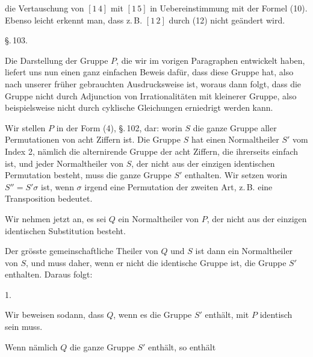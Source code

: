 
die Vertauschung von $[1\,4]$ mit $[1\,5]$ in Uebereinstimmung mit der Formel (10). Ebenso leicht erkennt man, dass z.\,B. $[1\,2]$ durch (12) nicht geändert wird.

\begin{center}
\S.\,103.

\end{center}

Die Darstellung der Gruppe $P$, die wir im vorigen Paragraphen entwickelt haben, liefert uns nun einen ganz einfachen Beweis dafür, dass diese Gruppe  hat, also nach unserer früher gebrauchten Ausdrucksweise  ist, woraus dann folgt, dass die Gruppe nicht durch Adjunction von Irrationalitäten mit kleinerer Gruppe, also beispielsweise nicht durch cyklische Gleichungen erniedrigt werden kann.

Wir stellen $P$ in der Form (4), \S.\,102, dar:
worin $S$ die ganze Gruppe aller Permutationen von acht Ziffern ist. Die Gruppe $S$ hat einen Normaltheiler $S'$ vom Index 2, nämlich die alternirende Gruppe der acht Ziffern, die ihrerseits einfach ist, und jeder Normaltheiler von $S$, der nicht aus der einzigen identischen Permutation besteht, muss die ganze Gruppe $S'$ enthalten. Wir setzen
worin $S'' = S'\sigma$ ist, wenn $\sigma$ irgend eine Permutation der zweiten Art, z.\,B. eine Transposition bedeutet.

Wir nehmen jetzt an, es sei $Q$ ein Normaltheiler von $P$, der nicht aus der einzigen identischen Substitution besteht.

Der grösste gemeinschaftliche Theiler von $Q$ und $S$ ist dann ein Normaltheiler von $S$, und muss daher, wenn er nicht die identische Gruppe ist, die Gruppe $S'$ enthalten. Daraus folgt:

1.\ 

Wir beweisen sodann, dass $Q$, wenn es die Gruppe $S'$ enthält, mit $P$ identisch sein muss.

Wenn nämlich $Q$ die ganze Gruppe $S'$ enthält, so enthält
